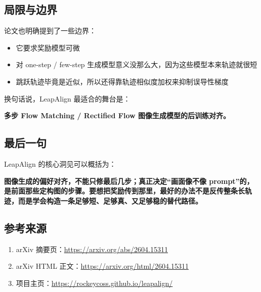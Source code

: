 \subsection{局限与边界}

论文也明确提到了一些边界：

\begin{itemize}[leftmargin=1.5em]
  \item 它要求奖励模型可微
  \item 对 one-step / few-step 生成模型意义没那么大，因为这些模型本来轨迹就很短
  \item 跳跃轨迹毕竟是近似，所以还得靠轨迹相似度加权来抑制误导性梯度
\end{itemize}

换句话说，LeapAlign 最适合的舞台是：

\textbf{多步 Flow Matching / Rectified Flow 图像生成模型的后训练对齐。}

\subsection{最后一句}

LeapAlign 的核心洞见可以概括为：

\textbf{图像生成的偏好对齐，不能只修最后几步；真正决定“画面像不像 prompt”的，是前面那些定构图的步骤。要想把奖励传到那里，最好的办法不是反传整条长轨迹，而是学会构造一条足够短、足够真、又足够稳的替代路径。}

\subsection{参考来源}

\begin{enumerate}[leftmargin=1.5em]
  \item arXiv 摘要页：\url{https://arxiv.org/abs/2604.15311}
  \item arXiv HTML 正文：\url{https://arxiv.org/html/2604.15311}
  \item 项目主页：\url{https://rockeycoss.github.io/leapalign/}
\end{enumerate}
